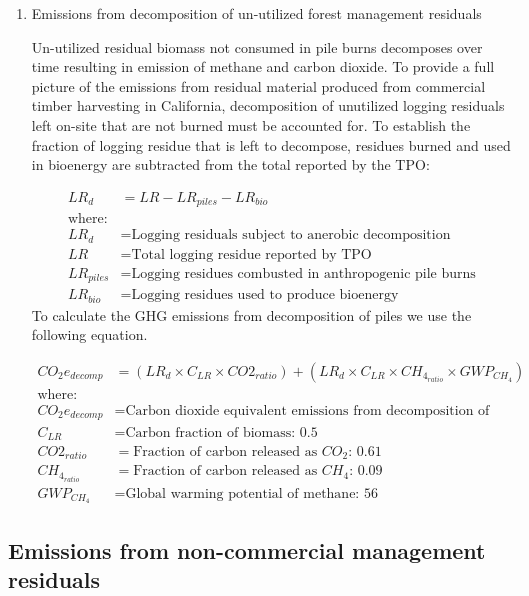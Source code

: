 \documentclass[a4paper]{article}
\begin{document}
\begin{enumerate}
\item Emissions from decomposition of un-utilized forest management residuals
\label{sec-3-4-0-2}

Un-utilized residual biomass not consumed in pile burns decomposes over
time resulting in emission of methane and carbon dioxide. To provide a
full picture of the emissions from residual material produced from
commercial timber harvesting in California, decomposition of unutilized
logging residuals left on-site that are not burned must be accounted
for. To establish the fraction of logging residue that is left to
decompose, residues burned and used in bioenergy are subtracted from the
total reported by the TPO:

\begin{align*}
LR_d &= LR - LR_{piles} - LR_{bio} \\
\text{where:}\\
LR_d &= \text{Logging residuals subject to anerobic decomposition} \\
LR &= \text{Total logging residue reported by TPO}\\
LR_{piles} &= \text{Logging residues combusted in anthropogenic pile burns}\\
LR_{bio} &= \text{Logging residues used to produce bioenergy}
\end{align*}
To calculate the GHG emissions from decomposition of piles we use the
following equation.

\begin{align*}
CO_2e_{decomp} &= \left(LR_d \times C_{LR} \times CO2_{ratio} \right) + \left(LR_d \times C_{LR} \times CH_4_{ratio}\times GWP_{CH_4}\right)\\
\text{where:}\\
CO_2e_{decomp} &= \text{Carbon dioxide equivalent emissions from decomposition of logging slash}\\
C_{LR} &= \text{Carbon fraction of biomass: 0.5}\\
CO2_{ratio} &= \text{Fraction of carbon released as } CO_2\text{: 0.61}\\
CH_4_{ratio} &= \text{Fraction of carbon released as } CH_4\text{: 0.09}\\
GWP_{CH_4} &= \text{Global warming potential of methane: 56}
\end{align*}
\end{enumerate}

\subsection{Emissions from non-commercial management residuals}
\label{sec-3-5}
\end{document}
